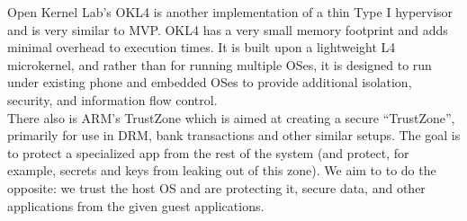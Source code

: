 Open Kernel Lab's OKL4 \cite{okl4} is another implementation of a thin Type I hypervisor and is very similar to MVP.  OKL4 has a very small memory footprint and adds minimal overhead to execution times.  It is built upon a lightweight L4 microkernel, and rather than for running multiple OSes, it is designed to run under existing phone and embedded OSes to provide additional isolation, security, and information flow control. \\

There also is ARM's TrustZone \cite{trustzone} which is aimed at creating a secure ``TrustZone'', primarily for use in DRM, bank transactions and other similar setups.  The goal is to protect a specialized app from the rest of the system (and protect, for example, secrets and keys from leaking out of this zone).  We aim to to do the opposite: we trust the host OS and are protecting it, secure data, and other applications from the given guest applications. \\
